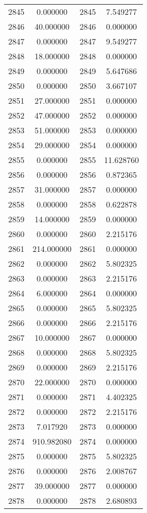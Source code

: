 \documentclass[12pt]{article}
\begin{document}
\begin{longtable}{@{}cccc@{}}
2845 & 0.000000 & 2845 & 7.549277 \\
2846 & 40.000000 & 2846 & 0.000000 \\
2847 & 0.000000 & 2847 & 9.549277 \\
2848 & 18.000000 & 2848 & 0.000000 \\
2849 & 0.000000 & 2849 & 5.647686 \\
2850 & 0.000000 & 2850 & 3.667107 \\
2851 & 27.000000 & 2851 & 0.000000 \\
2852 & 47.000000 & 2852 & 0.000000 \\
2853 & 51.000000 & 2853 & 0.000000 \\
2854 & 29.000000 & 2854 & 0.000000 \\
2855 & 0.000000 & 2855 & 11.628760 \\
2856 & 0.000000 & 2856 & 0.872365 \\
2857 & 31.000000 & 2857 & 0.000000 \\
2858 & 0.000000 & 2858 & 0.622878 \\
2859 & 14.000000 & 2859 & 0.000000 \\
2860 & 0.000000 & 2860 & 2.215176 \\
2861 & 214.000000 & 2861 & 0.000000 \\
2862 & 0.000000 & 2862 & 5.802325 \\
2863 & 0.000000 & 2863 & 2.215176 \\
2864 & 6.000000 & 2864 & 0.000000 \\
2865 & 0.000000 & 2865 & 5.802325 \\
2866 & 0.000000 & 2866 & 2.215176 \\
2867 & 10.000000 & 2867 & 0.000000 \\
2868 & 0.000000 & 2868 & 5.802325 \\
2869 & 0.000000 & 2869 & 2.215176 \\
2870 & 22.000000 & 2870 & 0.000000 \\
2871 & 0.000000 & 2871 & 4.402325 \\
2872 & 0.000000 & 2872 & 2.215176 \\
2873 & 7.017920 & 2873 & 0.000000 \\
2874 & 910.982080 & 2874 & 0.000000 \\
2875 & 0.000000 & 2875 & 5.802325 \\
2876 & 0.000000 & 2876 & 2.008767 \\
2877 & 39.000000 & 2877 & 0.000000 \\
2878 & 0.000000 & 2878 & 2.680893 \\

\end{longtable}
\end{document}
